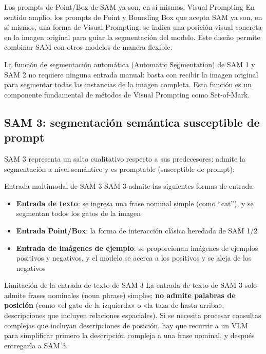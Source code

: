\documentclass[a4paper]{article}
\begin{document}
\begin{knowledgebox}{Los prompts de Point/Box de SAM ya son, en sí mismos, Visual Prompting}
En sentido amplio, los prompts de Point y Bounding Box que acepta SAM ya son, en sí mismos, una forma de Visual Prompting: se indica una posición visual concreta en la imagen original para guiar la segmentación del modelo. Este diseño permite combinar SAM con otros modelos de manera flexible.
\end{knowledgebox}

La función de segmentación automática (Automatic Segmentation) de SAM 1 y SAM 2 no requiere ninguna entrada manual: basta con recibir la imagen original para segmentar todas las instancias de la imagen completa. Esta función es un componente fundamental de métodos de Visual Prompting como Set-of-Mark.

\subsection{SAM 3: segmentación semántica susceptible de prompt}

SAM 3 representa un salto cualitativo respecto a sus predecesores: admite la segmentación a nivel semántico y es promptable (susceptible de prompt):

\begin{importantbox}{Entrada multimodal de SAM 3}
SAM 3 admite las siguientes formas de entrada:
\begin{itemize}
    \item \textbf{Entrada de texto}: se ingresa una frase nominal simple (como ``cat''), y se segmentan todos los gatos de la imagen
    \item \textbf{Entrada Point/Box}: la forma de interacción clásica heredada de SAM 1/2
    \item \textbf{Entrada de imágenes de ejemplo}: se proporcionan imágenes de ejemplos positivos y negativos, y el modelo se acerca a los positivos y se aleja de los negativos
\end{itemize}
\end{importantbox}

\begin{warningbox}{Limitación de la entrada de texto de SAM 3}
La entrada de texto de SAM 3 solo admite frases nominales (noun phrase) simples; \textbf{no admite palabras de posición} (como «el gato de la izquierda» o «la taza de hasta arriba», descripciones que incluyen relaciones espaciales). Si se necesita procesar consultas complejas que incluyan descripciones de posición, hay que recurrir a un VLM para simplificar primero la descripción compleja a una frase nominal, y después entregarla a SAM 3.
\end{warningbox}
\end{document}
